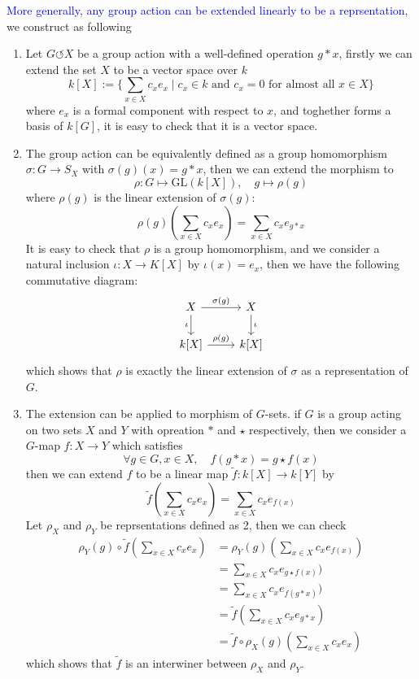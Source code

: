\textcolor{blue}{More generally, any group action can be extended linearly to be a reprsentation}, we construct as following
\begin{enumerate}
    \item Let \(G \circlearrowleft X\) be a group action with a well-defined operation \(g*x\), firstly we can extend the set \(X\) to be a vector space over \(k\)
    \[k[X] := \{\sum_{x \in X}c_xe_x \mid c_x \in k \text{ and } c_x = 0 \text{ for almost all } x \in X\}\]
    where \(e_x\) is a formal component with respect to \(x\), and toghether forms a basis of \(k[G]\), it is easy to check that it is a vector space.

    \item The group action can be equivalently defined as a group homomorphism \(\sigma: G \to S_X\) with \(\sigma(g)(x) = g*x\), then we can extend the morphism to 
    \[\rho:G \mapsto \mathrm{GL}(k[X]), \quad g \mapsto \rho(g)\]
    where \(\rho(g)\) is the linear extension of \(\sigma(g)\):
    \[\rho(g)(\sum_{x \in X}c_xe_x) = \sum_{x \in X}c_x e_{g*x}\]
    It is easy to check that \(\rho\) is a group homomorphism, and we consider a natural inclusion \(\iota:X \to K[X]\) by \(\iota(x) = e_x\), then we have the following commutative diagram:
    \[
\begin{tikzcd}
X \arrow[r, "\sigma(g)"] \arrow[d, "\iota"'] 
& X \arrow[d, "\iota"] \\
k[X] \arrow[r, "\rho(g)"] 
& k[X]
\end{tikzcd}
\]
    which shows that \(\rho\) is exactly the linear extension of \(\sigma\) as a representation of \(G\).

    \item The extension can be applied to morphism of \(G\)-sets. if \(G\) is a group acting on two sets \(X\) and \(Y\) with opreation \(*\) and \(\star \) respectively, then we consider a \(G\)-map \(f: X \to Y\) which satisfies
    \[\forall g \in G, x \in X,\quad f(g*x) = g \star f(x)\]
    then we can extend \(f\) to be a linear map \(\tilde{f}: k[X] \to k[Y]\) by
    \[\tilde{f}(\sum_{x \in X}c_xe_x) = \sum_{x \in X}c_x e_{f(x)}\]
    Let \(\rho_X\) and \(\rho_Y\) be reprsentations defined as 2, then we can check
    \begin{align*}
    \rho_Y(g) \circ \tilde{f}(\sum_{x \in X}c_xe_x) &= \rho_Y(g)(\sum_{x \in X}c_x e_{f(x)})\\
    &= \sum_{x \in X}c_x e_{g \star f(x)})\\
    &= \sum_{x \in X}c_x e_{f(g*x)})\\
    &= \tilde{f}(\sum_{x \in X}c_x e_{g*x})\\
    &= \tilde{f} \circ \rho_X(g)(\sum_{x \in X}c_xe_x)  
    \end{align*}
    which shows that \(\tilde{f}\) is an interwiner between \(\rho_X\) and \(\rho_Y\).
\end{enumerate}

